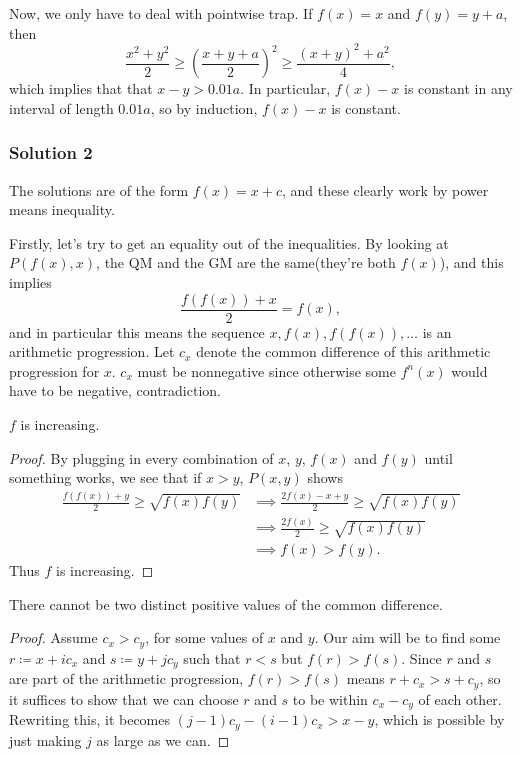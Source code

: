 \documentclass[11pt]{article}
\begin{document}
Now, we only have to deal with pointwise trap. If $f(x)=x$ and $f(y)=y+a$, then
$$\frac{x^2+y^2}{2} \geq \left(\frac{x+y+a}2\right)^2 \geq \frac{(x+y)^2+a^2}{4},$$which implies that that $x-y > 0.01a$. In particular, $f(x)-x$ is constant in any interval of length $0.01a$, so by induction, $f(x)-x$ is constant.

\newpage
\subsubsection{Solution 2}
The solutions are of the form $\boxed{f(x) = x + c}$, and these clearly work by power means inequality.

\medskip
Firstly, let's try to get an equality out of the inequalities. By looking at $P(f(x), x)$, the QM and the GM are the same(they're both $f(x)$), and this implies
\[ \frac{f(f(x)) + x}{2} = f(x) , \]and in particular this means the sequence $x, f(x), f(f(x)), \dots$ is an arithmetic progression. Let $c_x$ denote the common difference of this arithmetic progression for $x$. $c_x$ must be nonnegative since otherwise some $f^n(x)$ would have to be negative, contradiction.
\begin{claim}
     $f$ is increasing.
\end{claim}
\begin{proof}
    By plugging in every combination of $x$, $y$, $f(x)$ and $f(y)$ until something works, we see that if $ x > y$, $P(x, y)$ shows
\begin{align*}
\frac{f(f(x)) + y}{2} \ge \sqrt{f(x)f(y)} &\implies \frac{2f(x) - x + y}{2} \ge \sqrt{f(x)f(y)} \\
&\implies \frac{2f(x)}{2} \ge \sqrt{f(x)f(y)} \\ 
&\implies f(x) > f(y).
\end{align*}Thus $f$ is increasing. 
\end{proof}
\begin{claim}
    There cannot be two distinct positive values of the common difference.
\end{claim}
\begin{proof}
    Assume $c_x > c_y$, for some values of $x$ and $y$. Our aim will be to find some $r \coloneq x + ic_x$ and $s \coloneq y + jc_y$ such that $r < s$ but $f(r) > f(s)$. Since $r$ and $s$ are part of the arithmetic progression, $f(r) > f(s)$ means $r + c_x > s + c_y$, so it suffices to show that we can choose $r$ and $s$ to be within $c_x - c_y$ of each other. Rewriting this, it becomes $(j - 1)c_y - (i - 1)c_x > x - y$, which is possible by just making $j$ as large as we can. 
\end{proof}
\end{document}
